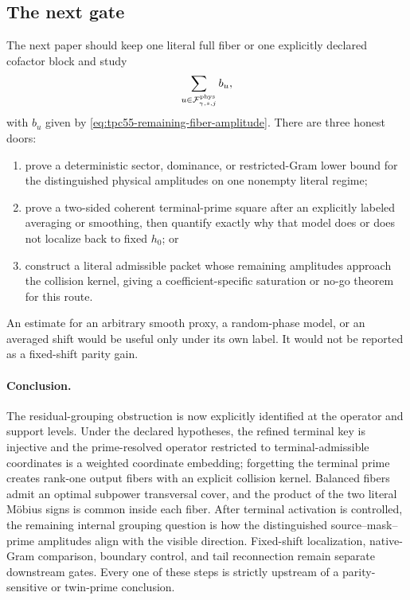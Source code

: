 \subsection{The next gate}

The next paper should keep one literal full fiber or one explicitly
declared cofactor block and study
\begin{equation}
 \sum_{u\in\mathcal F_{\gamma,s,j}^{\rm phys}} b_u,
 \label{eq:tpc55-next-fiber-sum}
\end{equation}
with \(b_u\) given by
\eqref{eq:tpc55-remaining-fiber-amplitude}.  There are three honest doors:
\begin{enumerate}[label=\textbf{Door \Alph*.},leftmargin=3.8em]
 \item prove a deterministic sector, dominance, or restricted-Gram lower
       bound for the distinguished physical amplitudes on one nonempty
       literal regime;
 \item prove a two-sided coherent terminal-prime square after an explicitly
       labeled averaging or smoothing, then quantify exactly why that model
       does or does not localize back to fixed \(h_0\); or
 \item construct a literal admissible packet whose remaining amplitudes
       approach the collision kernel, giving a coefficient-specific
       saturation or no-go theorem for this route.
\end{enumerate}
An estimate for an arbitrary smooth proxy, a random-phase model, or an
averaged shift would be useful only under its own label.  It would not be
reported as a fixed-shift parity gain.

\paragraph{Conclusion.}
The residual-grouping obstruction is now explicitly identified at the
operator and support levels.  Under the declared hypotheses, the refined
terminal key is injective and the prime-resolved operator restricted to
terminal-admissible coordinates is a weighted coordinate embedding;
forgetting the terminal prime creates rank-one output fibers with an
explicit collision kernel.  Balanced fibers admit an optimal subpower
transversal cover, and the product of the two literal M\"obius signs is
common inside each fiber.  After terminal activation is controlled, the
remaining internal
grouping question is how the distinguished source--mask--prime amplitudes
align with the visible direction.  Fixed-shift localization, native-Gram
comparison, boundary control, and tail reconnection remain separate
downstream gates.  Every one of these steps is strictly upstream of a
parity-sensitive or twin-prime conclusion.
